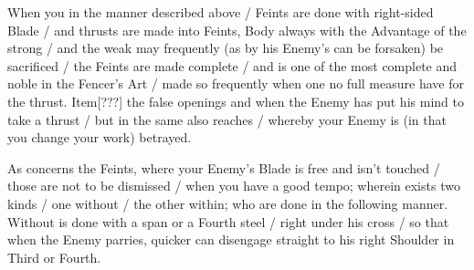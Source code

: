 
When you in the manner described above / Feints are done with
right-sided Blade / and thrusts are made into Feints, Body always
with the Advantage of the strong / and the weak may frequently (as by
his Enemy's can be forsaken) be sacrificed / the Feints are made
complete / and is one of the most complete and noble in the Fencer's
Art / made so frequently when one no full measure have for the
thrust. Item[???] the false
openings and when the Enemy has put his mind to take a thrust / but in
the same also reaches / whereby your Enemy is (in that you change your
work) betrayed.


As concerns the Feints, where your Enemy's Blade is free and isn't
touched / those are not to be dismissed / when you have a good tempo;
wherein exists two kinds / one without / the other within; who are
done in the following manner. Without is done with a span or a Fourth
steel / right under his cross / so that when the Enemy parries, quicker
can disengage straight to his right Shoulder in Third or Fourth.


